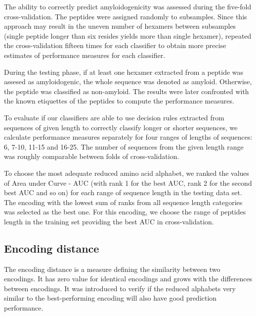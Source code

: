 \documentclass[a4,center,fleqn]{NAR}
\begin{document}
The ability to correctly predict amyloidogenicity was assessed during the 
five-fold cross-validation. The peptides were assigned randomly to 
subsamples. Since this approach may result in the uneven number of hexamers 
between subsamples (single peptide longer than six resides yields more than 
single hexamer), repeated the cross-validation fifteen times for each classifier 
to obtain more precise estimates of performance measures for each classifier. 

  During the testing phase, if at least one hexamer extracted from a peptide was 
assesed as amyloidogenic, the whole sequence was denoted as amyloid. Otherwise,
the peptide was classified as non-amyloid. The results were later confronted with 
the known etiquettes of the peptides to compute the performance measures.

  To evaluate if our classifiers are able to use decision rules extracted from 
sequences of given length to correctly classify longer or shorter sequences, we 
calculate performance measures separately for four ranges of lengths of 
sequences: 6, 7-10, 11-15 and 16-25. The number of sequences from the given 
%
%
%
length range was roughly comparable between folds of cross-validation.
  
  To choose the most adequate reduced amino acid alphabet, we ranked the values 
%
%
%
of Area under Curve - AUC (with rank 1 for the best AUC, rank 2 for the second 
best AUC and so on) for each range of sequence length in the testing data set. 
The encoding with the lowest sum of ranks from all sequence length categories 
was selected as the best one. For this encoding, we choose the range of peptides 
length in the training set providing the best AUC in cross-validation.

\subsection{Encoding distance}
The encoding distance is a measure defining the similarity between two 
encodings. It has zero value for identical encodings and grows with the 
differences between encodings. It was introduced to verify if the reduced 
alphabets very similar to the best-performing encoding will also have good 
prediction performance.
\end{document}
